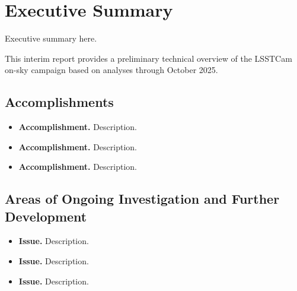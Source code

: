 \section{Executive Summary}
\label{sec:summary}

Executive summary here.

\begin{note}
    This interim report provides a preliminary technical overview of the LSSTCam on-sky campaign based on analyses through October 2025.
\end{note}

\subsection{Accomplishments}

\begin{itemize}
    \item \textbf{Accomplishment.} Description.
    \item \textbf{Accomplishment.} Description.
    \item \textbf{Accomplishment.} Description.
\end{itemize}

\subsection{Areas of Ongoing Investigation and Further Development}

\begin{itemize}
    \item \textbf{Issue.} Description.
    \item \textbf{Issue.} Description.
    \item \textbf{Issue.} Description.
\end{itemize}